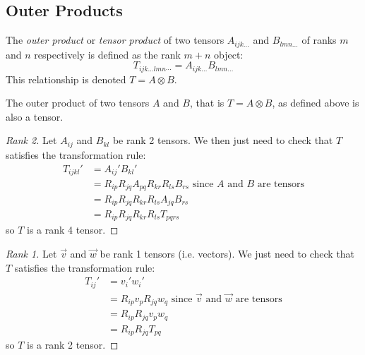 \documentclass[../main.tex]{subfiles}
\begin{document}
\subsection{Outer Products}
\begin{definition}
  The \textit{outer product} or \textit{tensor product} of two tensors $A_{ijk\ldots}$ and $B_{lmn\ldots}$ of ranks $m$ and $n$ respectively is defined as the rank $m + n$ object:
  \[
    T_{ijk\ldots lmn\cdots} = A_{ijk\ldots}B_{lmn\ldots}
  \]
  This relationship is denoted $T = A \otimes B$.
\end{definition}
\begin{lemma}
  The outer product of two tensors $A$ and $B$, that is $T = A \otimes B$, as defined above is also a tensor. \label{outerTensor}
\end{lemma}
\begin{proof}[Rank 2]
  Let $A_{i j}$ and $B_{k l}$ be rank 2 tensors.
  We then just need to check that $T$ satisfies the transformation rule:
  \begin{align*}
    T_{ijkl}' &= A_{i j}' B_{k l}' \\
              &= R_{i p}R_{j q}A_{p q}R_{k r}R_{l s}B_{r s} \text{ since $A$ and $B$ are tensors}\\
              &= R_{i p}R_{j q}R_{k r}R_{l s} A_{j q}B_{r s} \\
              &= R_{i p}R_{j q}R_{k r}R_{l s}T_{pqrs}
  \end{align*}
  so $T$ is a rank 4 tensor.
\end{proof}
\begin{proof}[Rank 1]
  Let $\vec{v}$ and $\vec{w}$ be rank 1 tensors (i.e. vectors).
  We just need to check that $T$ satisfies the transformation rule:
  \begin{align*}
    T_{i j}' &= v_{i}'w_{i}' \\
             &= R_{i p}v_{p}R_{j q}w_{q} \text{ since $\vec{v}$ and $\vec{w}$ are tensors} \\
             &= R_{i p}R_{j q}v_{p}w_{q} \\
             &= R_{i p}R_{j q}T_{p q}
  \end{align*}
  so $T$ is a rank 2 tensor.
\end{proof}
\end{document}
